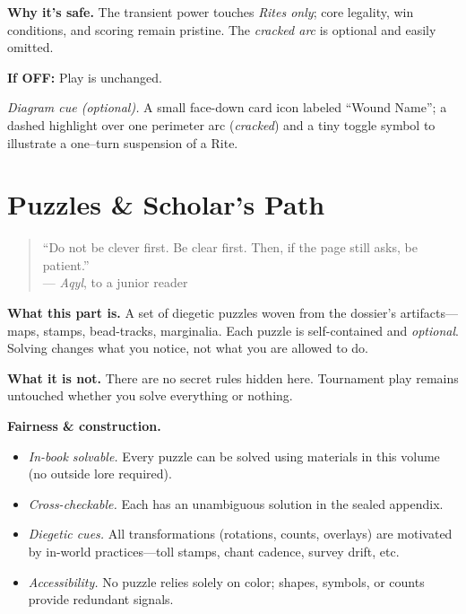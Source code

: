 \documentclass[11pt]{article}
\numberwithin{equation}{section} %
\theoremstyle{plain} %
\theoremstyle{definition} %
\theoremstyle{remark} %
\begin{document}
\medskip
\noindent\textbf{Why it’s safe.} The transient power touches \emph{Rites only}; core legality, win conditions, and scoring remain pristine. The \emph{cracked arc} is optional and easily omitted.

\medskip
\noindent\textbf{If \textsc{OFF}:} Play is unchanged.

\medskip
\noindent\textit{Diagram cue (optional).} A small face-down card icon labeled “Wound Name”; a dashed highlight over one perimeter arc (\emph{cracked}) and a tiny toggle symbol to illustrate a one–turn suspension of a Rite.

\clearpage



\section{Puzzles \& Scholar’s Path}
\label{part:puzzles}

\begin{quote}\small
“Do not be clever first. Be clear first. Then, if the page still asks, be patient.”\\
\hfill — \textit{Aqyl}, to a junior reader
\end{quote}

\noindent\textbf{What this part is.} A set of diegetic puzzles woven from the dossier’s artifacts—maps, stamps, bead-tracks, marginalia. Each puzzle is self-contained and \emph{optional}. Solving changes what you notice, not what you are allowed to do.

\medskip
\noindent\textbf{What it is not.} There are no secret rules hidden here. Tournament play remains untouched whether you solve everything or nothing.

\medskip
\noindent\textbf{Fairness \& construction.}
\begin{itemize}\setlength\itemsep{0.3em}
  \item \emph{In-book solvable.} Every puzzle can be solved using materials in this volume (no outside lore required).
  \item \emph{Cross-checkable.} Each has an unambiguous solution in the sealed appendix.
  \item \emph{Diegetic cues.} All transformations (rotations, counts, overlays) are motivated by in-world practices—toll stamps, chant cadence, survey drift, etc.
  \item \emph{Accessibility.} No puzzle relies solely on color; shapes, symbols, or counts provide redundant signals.
\end{itemize}
\end{document}
